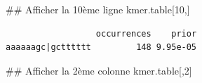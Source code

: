 \documentclass[]{article}
\newenvironment{Shaded}{\begin{snugshade}}{\end{snugshade}}
\newcommand{\DecValTok}[1]{\textcolor[rgb]{0.86,0.86,0.80}{#1}}
\newcommand{\NormalTok}[1]{\textcolor[rgb]{0.80,0.80,0.80}{#1}}
\begin{document}
\begin{Shaded}
\begin{Highlighting}[]
\NormalTok{## Afficher la 10ème ligne}
\NormalTok{kmer.table[}\DecValTok{10}\NormalTok{,] }
\end{Highlighting}
\end{Shaded}

\begin{verbatim}
                  occurrences    prior
aaaaaagc|gctttttt         148 9.95e-05
\end{verbatim}

\begin{Shaded}
\begin{Highlighting}[]
\NormalTok{## Afficher la 2ème colonne}
\NormalTok{kmer.table[,}\DecValTok{2}\NormalTok{] }
\end{Highlighting}
\end{Shaded}
\end{document}
